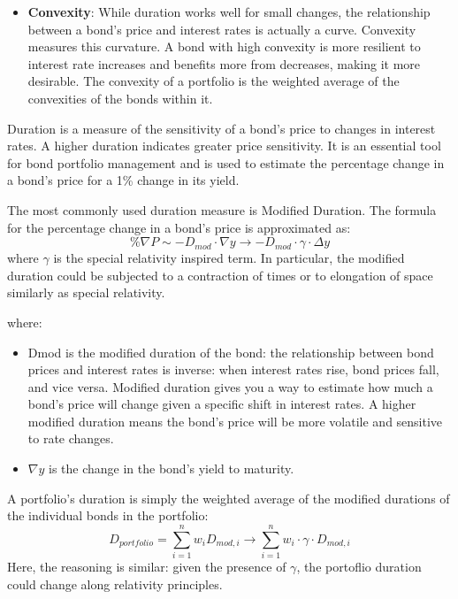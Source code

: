 \documentclass{article}
\begin{document}
\begin{itemize}
Analogously, a project's timeline or scope can appear to expand or contract depending on the information processing of its execution, much like time and space change from an observer's perspective in physics.
\item \textbf{Convexity}: While duration works well for small changes, the relationship between a bond's price and interest rates is actually a curve. Convexity measures this curvature. A bond with high convexity is more resilient to interest rate increases and benefits more from decreases, making it more desirable. The convexity of a portfolio is the weighted average of the convexities of the bonds within it.
\end{itemize}


Duration is a measure of the sensitivity of a bond's price to changes in interest rates. A higher duration indicates greater price sensitivity. It is an essential tool for bond portfolio management and is used to estimate the percentage change in a bond's price for a 1\% change in its yield.

The most commonly used duration measure is Modified Duration. The formula for the percentage change in a bond's price is approximated as:
\begin{equation}
    \% \nabla P \sim - D_{mod} \cdot \nabla y \rightarrow -D_{mod} \cdot \gamma \cdot \Delta y
\end{equation}
where $\gamma$ is the special relativity inspired term. In particular, the modified duration could be subjected to a contraction of times or to elongation of space similarly as special relativity. 


where:
\begin{itemize}
\item Dmod is the modified duration of the bond: the relationship between bond prices and interest rates is inverse: when interest rates rise, bond prices fall, and vice versa. Modified duration gives you a way to estimate how much a bond's price will change given a specific shift in interest rates. A higher modified duration means the bond's price will be more volatile and sensitive to rate changes. 
\item $\nabla y$ is the change in the bond's yield to maturity.
\end{itemize}

A portfolio's duration is simply the weighted average of the modified durations of the individual bonds in the portfolio:
\begin{equation}
    D_{portfolio} = \sum_{i=1}^n w_i D_{mod,i} \rightarrow \sum_{i=1}^n w_i \cdot \gamma \cdot D_{mod,i}
\end{equation}
Here, the reasoning is similar: given the presence of $\gamma$, the portoflio duration could change along relativity principles.
\end{document}
